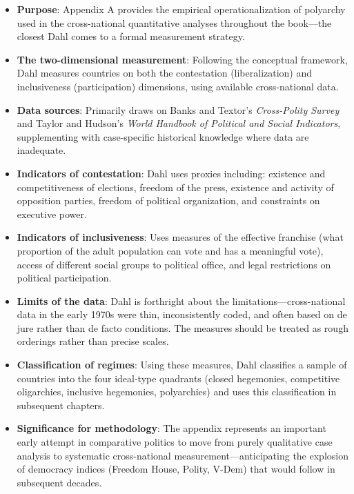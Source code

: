 \documentclass[12pt]{article}
\begin{document}
\begin{itemize}[leftmargin=*, itemsep=4pt]
    \item \textbf{Purpose}: Appendix A provides the empirical operationalization of polyarchy used in the cross-national quantitative analyses throughout the book---the closest Dahl comes to a formal measurement strategy.
    \item \textbf{The two-dimensional measurement}: Following the conceptual framework, Dahl measures countries on both the contestation (liberalization) and inclusiveness (participation) dimensions, using available cross-national data.
    \item \textbf{Data sources}: Primarily draws on Banks and Textor's \textit{Cross-Polity Survey} and Taylor and Hudson's \textit{World Handbook of Political and Social Indicators}, supplementing with case-specific historical knowledge where data are inadequate.
    \item \textbf{Indicators of contestation}: Dahl uses proxies including: existence and competitiveness of elections, freedom of the press, existence and activity of opposition parties, freedom of political organization, and constraints on executive power.
    \item \textbf{Indicators of inclusiveness}: Uses measures of the effective franchise (what proportion of the adult population can vote and has a meaningful vote), access of different social groups to political office, and legal restrictions on political participation.
    \item \textbf{Limits of the data}: Dahl is forthright about the limitations---cross-national data in the early 1970s were thin, inconsistently coded, and often based on de jure rather than de facto conditions. The measures should be treated as rough orderings rather than precise scales.
    \item \textbf{Classification of regimes}: Using these measures, Dahl classifies a sample of countries into the four ideal-type quadrants (closed hegemonies, competitive oligarchies, inclusive hegemonies, polyarchies) and uses this classification in subsequent chapters.
    \item \textbf{Significance for methodology}: The appendix represents an important early attempt in comparative politics to move from purely qualitative case analysis to systematic cross-national measurement---anticipating the explosion of democracy indices (Freedom House, Polity, V-Dem) that would follow in subsequent decades.
\end{itemize}
\end{document}
